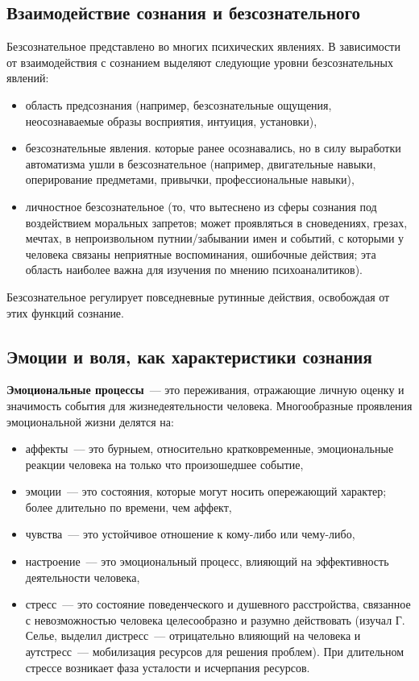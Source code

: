 \subsection{Взаимодействие сознания и безсознательного}
Безсознательное представлено во многих психических явлениях. В зависимости от взаимодействия с сознанием выделяют следующие уровни безсознательных явлений:
\begin{itemize}
	\item область предсознания (например, безсознательные ощущения, неосознаваемые образы восприятия, интуиция, установки),
	\item безсознательные явления. которые ранее осознавались, но в силу выработки автоматизма ушли в безсознательное (например, двигательные навыки, оперирование предметами, привычки, профессиональные навыки),
	\item личностное безсознательное (то, что вытеснено из сферы сознания под воздействием моральных запретов; может проявляться в сноведениях, грезах, мечтах, в непроизвольном путнии/забывании имен и событий, с которыми у человека связаны неприятные воспоминания, ошибочные действия; эта область наиболее важна для изучения по мнению психоаналитиков).
\end{itemize}

Безсознательное регулирует повседневные рутинные действия, освобождая от этих функций сознание.

\subsection{Эмоции и воля, как характеристики сознания}
\textbf{Эмоциональные процессы}~--- это переживания, отражающие личную оценку и значимость события для жизнедеятельности человека. Многообразные проявления эмоциональной жизни делятся на:
\begin{itemize}
	\item аффекты~--- это бурныем, относительно кратковременные, эмоциональные реакции человека на только что произошедшее событие,
	\item эмоции~--- это состояния, которые могут носить опережающий характер; более длительно по времени, чем аффект,
	\item чувства~--- это устойчивое отношение к кому-либо или чему-либо,
	\item настроение~--- это эмоциональный процесс, влияющий на эффективность деятельности человека,
	\item стресс~--- это состояние поведенческого и душевного расстройства, связанное с невозможностью человека целесообразно и разумно действовать (изучал Г. Селье, выделил дистресс~--- отрицательно влияющий на человека и аутстресс~--- мобилизация ресурсов для решения проблем). При длительном стрессе возникает фаза усталости и исчерпания ресурсов.
\end{itemize}

